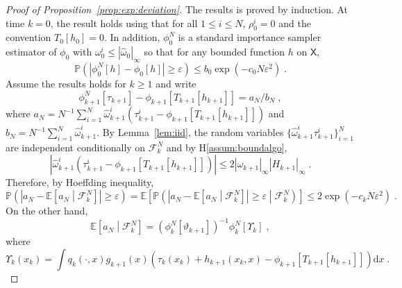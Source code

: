 \documentclass[12pt,draft]{article}
\newcommand{\rmd}{\mathrm{d}}
\newcommand{\eqsp}{\;}
\newcommand{\1}{\mathrm{1}}
\begin{document}

\begin{proof}[Proof of Proposition~\ref{prop:exp:deviation}]
The results is proved by induction. At time $k=0$, the result holds using that for all $1\le i \le N$, $\rho_0^i = 0$ and the convention $T_0[h_0] =0$. In addition, $\phi_0^N$ is a standard importance sampler estimator of $\phi_0$ with $\omega_0^i\le |\widehat{\omega}_0|_{\infty}$ so that for any bounded function $h$ on $\mathsf{X}$,
\[
\mathbb{P}\left(\left|\phi_0^N[h] - \phi_0\left[h\right]\right|\ge \varepsilon\right)\le b_0\exp\left(-c_0N\varepsilon^2\right)\eqsp.
\]
Assume the results holds for $k\ge 1$ and write
\[
\phi_{k+1}^N[\tau_{k+1}] - \phi_{k+1}\left[T_{k+1}[h_{k+1}]\right] = a_N/b_N\eqsp,
\]
where $a_N = N^{-1}\sum_{i=1}^N \widehat{\omega}_{k+1}^i \left(\tau_{k+1}^i - \phi_{k+1}\left[T_{k+1}[h_{k+1}]\right]\right)$ and $b_N =N^{-1}\sum_{i=1}^N \widehat{\omega}_{k+1}^i$. By Lemma~\ref{lem:iid}, the random variables $\{\widehat{\omega}_{k+1}^i\tau_{k+1}^i\}_{i=1}^N$ are independent conditionally on $\mathcal{F}_k^{N}$ and by H\ref{assum:boundalgo},
\[
\left|\widehat{\omega}_{k+1}^i \left(\tau_{k+1}^i - \phi_{k+1}\left[T_{k+1}[h_{k+1}]\right]\right)\right| \le 2|\widehat{\omega}_{k+1}|_{\infty}|H_{k+1}|_{\infty}\eqsp.
\]
Therefore, by Hoeffding inequality,
\[
\mathbb{P}\left(\left|a_N - \mathbb{E}\left[a_N\middle|\mathcal{F}_k^{N}\right]\right|\ge \varepsilon\right) = \mathbb{E}\left[\mathbb{P}\left(\left|a_N - \mathbb{E}\left[a_N\middle|\mathcal{F}_k^{N}\right]\right|\ge \varepsilon\middle|\mathcal{F}_k^{N}\right)\right]\le 2\exp\left(-c_kN\varepsilon^2\right)\eqsp.
\] 
On the other hand,
\[
\mathbb{E}\left[a_N\middle|\mathcal{F}_k^{N}\right] = \left(\phi^N_{k}[\vartheta_{k+1}]\right)^{-1}\phi^N_{k}\left[\Upsilon_k\right] \eqsp,
\]
where
\[
\Upsilon_k(x_k) = \int q_{k}(\cdot,x)g_{k+1}(x)\left(\tau_k(x_k) + h_{k+1}(x_k,x) - \phi_{k+1}\left[T_{k+1}[h_{k+1}]\right]\right)\rmd x\eqsp.
\]
\end{proof}
\end{document}
